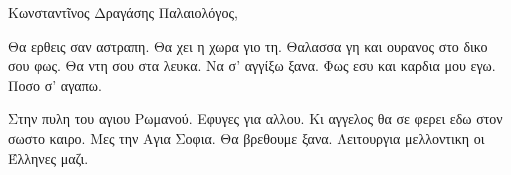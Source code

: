 \documentclass[a4paper,11pt]{article}
\begin{document}
\rmfamily


Κωνσταντῖνος Δραγάσης Παλαιολόγος,
\vspace{1em}



\lipsum[1]

\lipsum[2]

Θα ερθεις σαν αστραπη. Θα χει η χωρα γιο τη. Θαλασσα γη και ουρανος στο δικο σου φως.
Θα ντη σου στα λευκα. Να σ' αγγίξω ξανα. Φως εσυ και καρδια μου εγω. Ποσο σ' αγαπω.

Στην πυλη του αγιου Ρωμανού. Εφυγες για αλλου. Κι αγγελος θα σε φερει εδω στον σωστο καιρο.
Μες την Αγια Σοφια. Θα βρεθουμε ξανα. Λειτουργια μελλοντικη οι Έλληνες μαζι.


\end{document}
